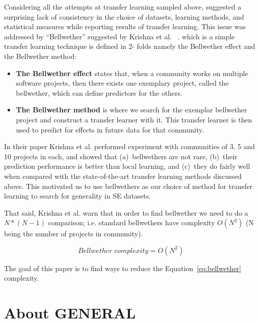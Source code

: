 \documentclass[10pt,journal,compsoc]{IEEEtran}
\newcommand{\bi}{\begin{itemize}}
\newcommand{\ei}{\end{itemize}}
\begin{document}
Considering all the attempts at transfer learning sampled above, suggested a surprising lack of consistency in the choice of datasets, learning methods, and statistical measures while reporting results of transfer learning. This issue was addressed by ``Bellwether'' suggested by Krishna et al. ~\cite{krishna2017simpler,krishna16}. which is a simple transfer learning technique is defined in 2- folds namely the Bellwether effect and the Bellwether method:

\bi

    \item \textbf{The Bellwether effect} states that, when a community works on multiple software projects,  then there exists one exemplary project, called the bellwether, which can define predictors for the others.
    
    \item \textbf{The Bellwether method} is where we search for the exemplar bellwether project and construct a transfer learner with it. This transfer learner is then used to predict for effects in future data for that community.

\ei

In their paper Krishna et al. performed experiment with communities of 3, 5 and 10 projects in each, and showed that (a)~bellwethers are not rare, (b)~their prediction performance is better than local learning, and (c)~they do fairly well when compared with 
the state-of-the-art transfer learning methods discussed above.
This motivated us to use  bellwethers as our choice of method for transfer learning to search for generality in SE datasets. 

That said,  Krishna et al. warn that in order to find bellwether we need to do a $ N*(N-1) $ comparison; i.e. standard bellwethers
have complexity $ O(N^2) $ (N being the number of projects in community). 

\begin{equation}
\label{eq:bellwether}
    \mathit{Bellwether\; complexity } = O(N^2)
\end{equation}

The goal of this paper is to find ways to reduce the Equation~\ref{eq:bellwether} complexity.




 
\section{About GENERAL}\label{sec:Metric Extraction}
\label{GENERAL}
\end{document}
